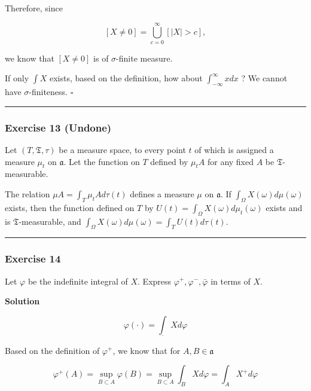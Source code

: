 \documentclass[
]{article}
\begin{document}
Therefore, since

\[[X \ne 0] = \bigcup_{c=0}^\infty\left[ |X| > c \right],\]

we know that \([X \ne 0]\) is of \(\sigma\)-finite measure.

If only \(\int X\) exists, based on the definition, how about
\(\int_{-\infty}^\infty x  dx\) ? We cannot have \(\sigma\)-finiteness.
\(\square\)

\begin{center}\rule{0.5\linewidth}{0.5pt}\end{center}

\hypertarget{exercise-13-undone}{%
  \subsubsection{Exercise 13 (Undone)}\label{exercise-13-undone}}

Let \((T, \mathfrak T, \tau)\) be a measure space, to every point \(t\)
of which is assigned a measure \(\mu_t\) on \(\mathfrak a\). Let the
function on \(T\) defined by \(\mu_t A\) for any fixed \(A\) be
\(\mathfrak T\)-measurable.

The relation \(\mu A=\int_T \mu_t A d \tau(t)\) defines a measure
\(\mu\) on \(\mathfrak a\). If \(\int_{\Omega} X(\omega) d \mu(\omega)\)
exists, then the function defined on \(T\) by
\(U(t)=\int_{\Omega} X(\omega) d \mu_t(\omega)\) exists and is
\(\mathfrak T\)-measurable, and
\(\int_{\Omega} X(\omega) d \mu(\omega)=\int_T U(t) d \tau(t)\).

\begin{center}\rule{0.5\linewidth}{0.5pt}\end{center}

\hypertarget{exercise-14-2}{%
  \subsubsection{Exercise 14}\label{exercise-14-2}}

Let \(\varphi\) be the indefinite integral of \(X\). Express
\(\varphi^{+}, \varphi^{-}, \bar{\varphi}\) in terms of \(X\).

\textbf{Solution}

\[\varphi(\cdot) = \int_{\cdot} X d\varphi\]

Based on the definition of \(\varphi^+\), we know that for
\(A, B \in \mathfrak a\)

\[\varphi^+(A) = \sup_{B\subset A} \varphi(B) = \sup_{B\subset A} \int_{B} X d\varphi = \int_A X^+ d\varphi\]
\end{document}
